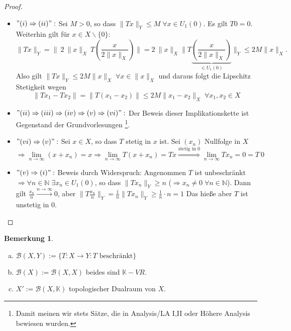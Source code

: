 \documentclass[ngerman]{report}
\theoremstyle{plain}%
\theoremstyle{definition}%
\theoremstyle{myStyle}
\newtheorem{bem}[thm]{Bemerkung}
\newcommand{\N}{\mathbb{N}}
\newcommand{\K}{\mathbb{K}}
\newcommand{\B}{\mathcal{B}} %
\newcommand{\norm}[1]{\|#1\|}
\newcommand{\df}{\Rightarrow} %
\newcommand{\U}[2][1]{U_{#1}(#2)} %
\newcommand{\EK}{\U{0}} %
\newcommand{\limes}[1][\infty]{\lim_{n \to #1}}
\begin{document}
	\begin{proof}
		\begin{itemize}[]
			\item $"(i) \df (ii)":$ 
				Sei $M > 0$, so dass $\norm{Tx}_Y \leq M \; \forall x \in U_1(0)$. Es gilt $T0 = 0$.
				Weiterhin gilt für $x \in X\backslash \{0\}$: 
				$$\norm{Tx}_Y = \norm{\: 2 \: \norm{x}_X \: T\left(\frac{x}{2 \norm{x}_X}\right)}
			  =	2 \: \norm{x}_X\norm{T\underbrace{\left(\frac{x}{2 \norm{x}_X}\right)}_{\in \EK}}_Y
				\leq 2 M \norm{x}_X.$$
				Also gilt $\norm{Tx}_Y \leq 2M \norm{x}_X \; \forall x \in \norm{x}_X$ 
				und daraus folgt die Lipschitz Stetigkeit wegen 
				$$ \norm{Tx_1 - Tx_2} = \norm{ T(x_1 - x_2)} \leq 2 M \norm{x_1 - x_2}_X \; \forall x_1, x_2\in X$$ 
											
			\item $"(ii) \df (iii) \df (iv) \df (v) \df (vi)":$ 
				Der Beweis dieser Implikationskette ist Gegenstand der Grundvorlesungen \footnote{Damit meinen wir stets Sätze, die in Analysis\slash LA I,II oder Höhere Analysis bewiesen wurden.}.
				
			\item $"(vi) \df (v)":$ 
				Sei $x \in X$, so dass $T$ stetig in $x$ ist. Sei $(x_n)$ Nullfolge in $X$
				$$\df \limes (x + x_n) = x \df \limes T(x+x_n) = Tx 
				\overset{\text{stetig in 0}}{\df}\limes T x_n = 0 = T\:0$$ 

			\item $"(v) \df (i)":$ Beweis durch Widerspruch:
				Angenommen $T$ ist unbeschränkt $\df \forall n \in \N \; \exists x_n \in \EK$, so dass
				$\norm{Tx_n}_Y \geq n$ ($\df x_n \not = 0 \; \forall n\in\N$). 
				Dann gilt $\frac{x_n}{n} \overset{n\to\infty}{\longrightarrow} 0$,
				aber $\norm{T\frac{x_n}{n}}_Y = \frac{1}{n} \norm{T x_n}_Y \geq \frac{1}{n} \cdot n = 1$
				Das hieße aber $T$ ist unstetig in 0. 

		\end{itemize}
	\end{proof}

	\begin{bem} 
		\begin{enumerate}[a)]
			\item $\B(X,Y) := \{ T: X\to Y: T \text{ beschränkt}\}$
			\item $\B(X) := \B(X,X)$ beides sind $\K-VR$.
			\item $X' := \B(X,\K)$ topologischer Dualraum von	$X$.
		\end{enumerate}
	\end{bem}					
	
\end{document}
